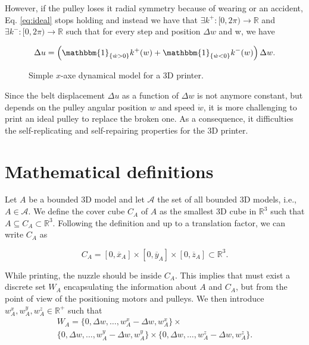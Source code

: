 \documentclass[conference]{IEEEtran}
\newcommand{\R}{\mathbb{R}}
\begin{document}
However, if the pulley loses it radial symmetry because of wearing or an accident, Eq. \ref{eq:ideal} stops holding and instead we have that $\exists k^+:[0,2\pi)\to\R$ and $\exists k^-:[0,2\pi)\to\R$ such that for every step and position $\Delta w$ and w, we have

\begin{equation}
\Delta u=\left(\mathbbm{1}_{\{\dot{w}>0\}}k^+(w)+\mathbbm{1}_{\{\dot{w}<0\}}k^-(w)\right)\Delta w.
\label{eq:nonideal}
\end{equation}

\begin{figure}[htbp]
\caption{Simple $x$-axe dynamical model for a 3D printer.}
\label{perfect_pulley}
\end{figure}

Since the belt displacement $\Delta u$ as a function of $\Delta w$ is not anymore constant, but depends on the pulley angular position $w$ and speed $\dot{w}$, it is more challenging to print an ideal pulley to replace the broken one. As a consequence, it difficulties the self-replicating and self-repairing properties for the 3D printer.

\section{Mathematical definitions}

Let $A$ be a bounded 3D model and let $\mathcal{A}$ the set of all bounded 3D models, i.e., $A\in\mathcal{A}$. We define the cover cube $C_A$ of $A$ as the smallest 3D cube in $\R^3$ such that $A
\subseteq C_A\subset\R^3$. Following the definition and up to a translation factor, we can write $C_A$ as

\begin{equation}
C_A=[0,\overline{x}_A]\times[0,\overline{y}_A]\times[0,\overline{z}_A]\subset\R^3.
\end{equation}

While printing, the nuzzle should be inside $C_A$. This implies that must exist a discrete set $W_A$ encapsulating the information about $A$ and $C_A$, but from the point of view of the positioning motors and pulleys. We then introduce $w_A^x,w_A^y,w_A^z\in\R^+$ such that
\begin{multline}
W_A=\{0,\Delta w,\dots,w_A^x-\Delta w,w_A^x\}\times\\
\{0,\Delta w,\dots,w_A^y-\Delta w,w_A^y\}\times\{0,\Delta w,\dots,w_A^z-\Delta w,w_A^z\}.
\end{multline}
\end{document}
